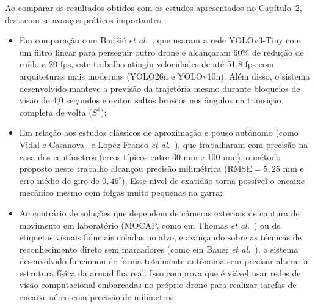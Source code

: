 Ao comparar os resultados obtidos com os estudos apresentados no Capítulo~2, destacam-se avanços práticos importantes:
\begin{itemize}
	\item Em comparação com Bari\v{s}i\'c \textit{et al.}~\cite{barisic2019}, que usaram a rede YOLOv3-Tiny com um filtro linear para perseguir outro drone e alcançaram 60\% de redução de ruído a 20 fps, este trabalho atingiu velocidades de até 51,8 fps com arquiteturas mais modernas (YOLO26n e YOLOv10n). Além disso, o sistema desenvolvido manteve a previsão da trajetória mesmo durante bloqueios de visão de 4,0 segundos e evitou saltos bruscos nos ângulos na transição completa de volta ($S^1$);
	\item Em relação aos estudos clássicos de aproximação e pouso autônomo (como Vidal e Casanova~\cite{vidal2007} e Lopez-Franco \textit{et al.}~\cite{lopezfranco2017}), que trabalharam com precisão na casa dos centímetros (erros típicos entre 30 mm e 100 mm), o método proposto neste trabalho alcançou precisão milimétrica ($\text{RMSE} = 5{,}25\text{ mm}$ e erro médio de giro de $0{,}46^\circ$). Esse nível de exatidão torna possível o encaixe mecânico mesmo com folgas muito pequenas na garra;
	\item Ao contrário de soluções que dependem de câmeras externas de captura de movimento em laboratório (MOCAP, como em Thomas \textit{et al.}~\cite{thomas2014}) ou de etiquetas visuais fiduciais coladas no alvo, e avançando sobre as técnicas de reconhecimento direto sem marcadores (como em Bauer \textit{et al.}~\cite{bauer2023}), o sistema desenvolvido funcionou de forma totalmente autônoma sem precisar alterar a estrutura física da armadilha real. Isso comprova que é viável usar redes de visão computacional embarcadas no próprio drone para realizar tarefas de encaixe aéreo com precisão de milímetros.
\end{itemize}